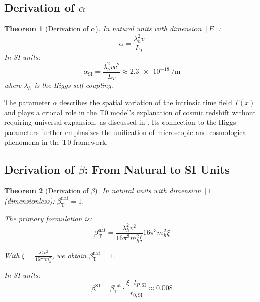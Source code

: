 \documentclass[12pt,a4paper]{article}
\newcommand{\Tfield}{T(x)}
\newcommand{\betaT}{\beta_{\text{T}}}
\newtheorem{theorem}{Theorem}[section]
\begin{document}
	\subsection{Derivation of \(\alpha\)}
	\label{subsec:alpha_derivation}
	
	\begin{theorem}[Derivation of \(\alpha\)]
		In natural units with dimension \([E]\):
		\begin{equation}
			\alpha = \frac{\lambda_h^2 v}{L_T}
		\end{equation}
		In SI units:
		\begin{equation}
			\alpha_{\text{SI}} = \frac{\lambda_h^2 v c^2}{L_T} \approx \SI{2.3e-18}{\per\meter}
		\end{equation}
		where \(\lambda_h\) is the Higgs self-coupling.
	\end{theorem}
	
	The parameter \(\alpha\) describes the spatial variation of the intrinsic time field \(\Tfield\) and plays a crucial role in the T0 model's explanation of cosmic redshift without requiring universal expansion, as discussed in \cite{pascher_messdifferenzen_2025}. Its connection to the Higgs parameters further emphasizes the unification of microscopic and cosmological phenomena in the T0 framework.
	
	\subsection{Derivation of \(\beta\): From Natural to SI Units}
	\label{subsec:beta_derivation}
	
	\begin{theorem}[Derivation of \(\beta\)]
		In natural units with dimension \([1]\) (dimensionless): \(\betaT^{\text{nat}} = 1\). 
		
		The primary formulation is:
		\begin{equation}
			\betaT^{\text{nat}} = \frac{\lambda_h^2 v^2}{16\pi^3 m_h^2 \xi}{16\pi^3 m_h^2 \xi}
		\end{equation}
		
		With \(\xi = \frac{\lambda_h^2 v^2}{16\pi^3 m_h^2}\), we obtain \(\betaT^{\text{nat}} = 1\).
		
		In SI units:
		\begin{equation}
			\betaT^{\text{SI}} = \betaT^{\text{nat}} \cdot \frac{\xi \cdot l_{P,\text{SI}}}{r_{0,\text{SI}}} \approx 0.008
		\end{equation}
	\end{theorem}
	
\end{document}

